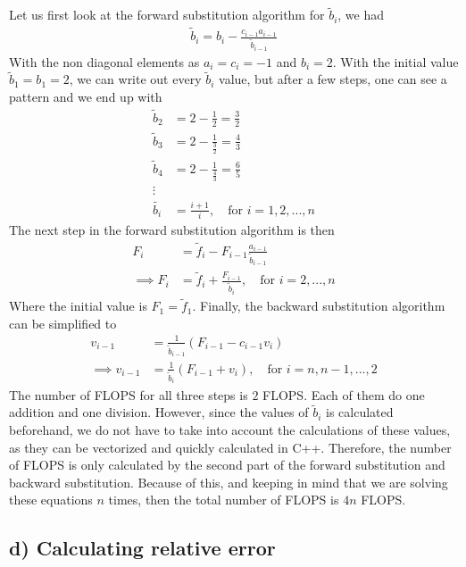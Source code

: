 \documentclass[12pt]{article}
\begin{document}
Let us first look at the forward substitution algorithm for $\tilde{b}_i$, we had
\begin{align}
\tilde{b}_i = b_i - \frac{c_{i-1}a_{i-1}}{\tilde{b}_{i-1}}
\end{align}
With the non diagonal elements as $a_i = c_i = -1$ and $b_i = 2$. With the initial value $\tilde{b}_1 = b_1 = 2$, we can write out every $\tilde{b}_i$ value, but after a few steps, one can see a pattern and we end up with
\begin{align}
\tilde{b}_2 &= 2 - \frac{1}{2} = \frac{3}{2} \nonumber \\
\tilde{b}_3 &= 2 - \frac{1}{\frac{3}{2}} = \frac{4}{3} \nonumber \\
\tilde{b}_4 &= 2 - \frac{1}{\frac{4}{3}} = \frac{6}{5} \nonumber \\
\vdots \nonumber \\
\tilde{b_i} &= \frac{i+1}{i}, \quad \text{for } i = 1,2,...,n
\end{align}
The next step in the forward substitution algorithm is then
\begin{align}
F_i &= \tilde{f}_i - F_{i-1}\frac{a_{i-1}}{\tilde{b}_{i-1}}  \nonumber \\
\implies F_i &= \tilde{f}_i + \frac{F_{i-1}}{\tilde{b}_i}, \quad \text{for } i=2,...,n
\end{align}
Where the initial value is $F_1 = \tilde{f}_1$. Finally, the backward substitution algorithm can be simplified to
\begin{align}
v_{i-1} &= \frac{1}{\tilde{b}_{i-1}}(F_{i-1}-c_{i-1}v_i) \nonumber \\
\implies v_{i-1} &= \frac{1}{\tilde{b}_i}(F_{i-1} + v_i), \quad \text{for } i = n, n-1, ..., 2
\end{align}
The number of FLOPS for all three steps is $2$ FLOPS. Each of them do one addition and one division. However, since the values of $\tilde{b}_i$ is calculated beforehand, we do not have to take into account the calculations of these values, as they can be vectorized and quickly calculated in C++. Therefore, the number of FLOPS is only calculated by the second part of the forward substitution and backward substitution. Because of this, and keeping in mind that we are solving these equations $n$ times, then the total number of FLOPS is $4n$ FLOPS.

\subsection*{d) Calculating relative error}
\end{document}
